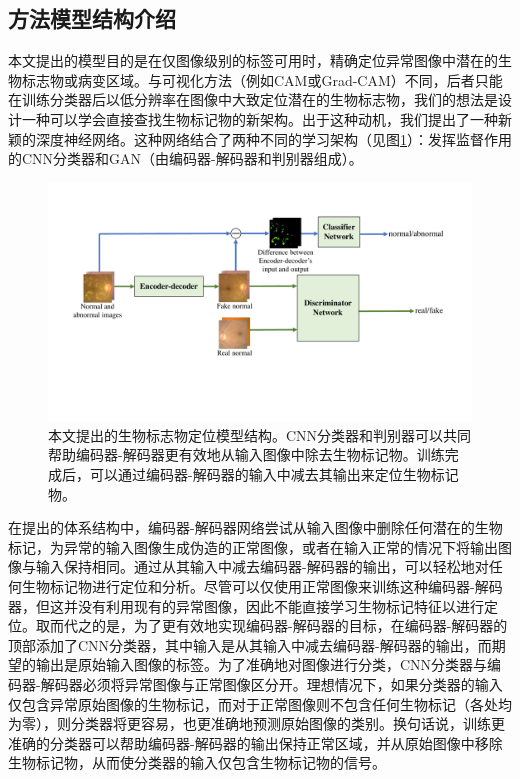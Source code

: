 \subsection{方法模型结构介绍}\label{subsec:model_architecture}
本文提出的模型目的是在仅图像级别的标签可用时，精确定位异常图像中潜在的生物标志物或病变区域。与可视化方法（例如CAM或Grad-CAM）不同，后者只能在训练分类器后以低分辨率在图像中大致定位潜在的生物标志物，我们的想法是设计一种可以学会直接查找生物标记物的新架构。出于这种动机，我们提出了一种新颖的深度神经网络。这种网络结合了两种不同的学习架构（见图\ref{fig:our_model_architecture}）：发挥监督作用的CNN分类器和GAN（由编码器-解码器和判别器组成）。

\begin{figure}[h]
	\centering
	\includegraphics[width=1.0\textwidth]{figure/method.pdf}
	\caption{本文提出的生物标志物定位模型结构。CNN分类器和判别器可以共同帮助编码器-解码器更有效地从输入图像中除去生物标记物。训练完成后，可以通过编码器-解码器的输入中减去其输出来定位生物标记物。} 
	\label{fig:our_model_architecture}
\end{figure}

在提出的体系结构中，编码器-解码器网络尝试从输入图像中删除任何潜在的生物标记，为异常的输入图像生成伪造的正常图像，或者在输入正常的情况下将输出图像与输入保持相同。通过从其输入中减去编码器-解码器的输出，可以轻松地对任何生物标记物进行定位和分析。尽管可以仅使用正常图像来训练这种编码器-解码器，但这并没有利用现有的异常图像，因此不能直接学习生物标记特征以进行定位。取而代之的是，为了更有效地实现编码器-解码器的目标，在编码器-解码器的顶部添加了CNN分类器，其中输入是从其输入中减去编码器-解码器的输出，而期望的输出是原始输入图像的标签。为了准确地对图像进行分类，CNN分类器与编码器-解码器必须将异常图像与正常图像区分开。理想情况下，如果分类器的输入仅包含异常原始图像的生物标记，而对于正常图像则不包含任何生物标记（各处均为零），则分类器将更容易，也更准确地预测原始图像的类别。换句话说，训练更准确的分类器可以帮助编码器-解码器的输出保持正常区域，并从原始图像中移除生物标记物，从而使分类器的输入仅包含生物标记物的信号。

